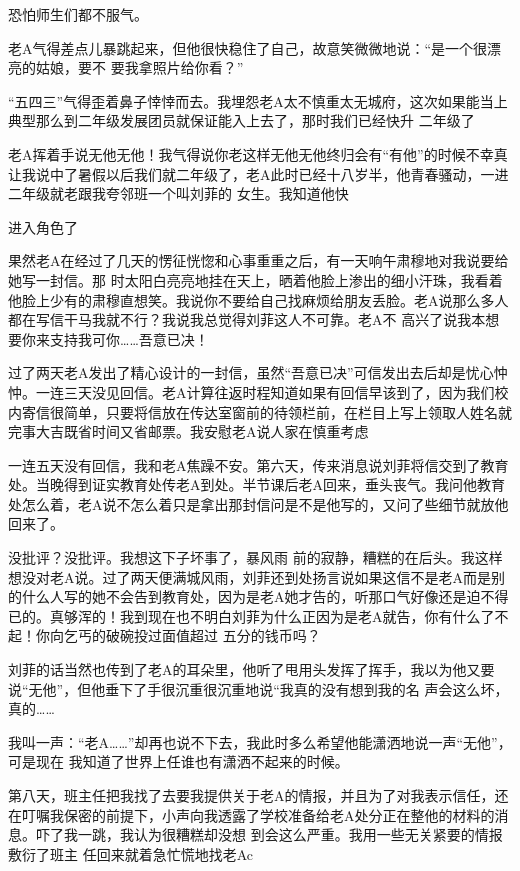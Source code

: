 \documentclass{article}
\begin{document}
恐怕师生们都不服气。 

老A气得差点儿暴跳起来，但他很快稳住了自己，故意笑微微地说：“是一个很漂亮的姑娘，要不
要我拿照片给你看？” 

“五四三”气得歪着鼻子悻悻而去。我埋怨老A太不慎重太无城府，这次如果能当上典型那么到二年级发展团员就保证能入上去了，那时我们已经快升
二年级了 

老A挥着手说无他无他！我气得说你老这样无他无他终归会有“有他”的时候不幸真让我说中了暑假以后我们就二年级了，老A此时已经十八岁半，他青春骚动，一进二年级就老跟我夸邻班一个叫刘菲的
女生。我知道他快 


进入角色了 

果然老A在经过了几天的愣征恍惚和心事重重之后，有一天响午肃穆地对我说要给她写一封信。那
\newpage
时太阳白亮亮地挂在天上，晒着他脸上渗出的细小汗珠，我看着他脸上少有的肃穆直想笑。我说你不要给自己找麻烦给朋友丢脸。老A说那么多人都在写信干马我就不行？我说我总觉得刘菲这人不可靠。老A不
高兴了说我本想要你来支持我可你……吾意已决！ 

过了两天老A发出了精心设计的一封信，虽然“吾意已决”可信发出去后却是忧心忡忡。一连三天没见回信。老A计算往返时程知道如果有回信早该到了，因为我们校内寄信很简单，只要将信放在传达室窗前的待领栏前，在栏目上写上领取人姓名就完事大吉既省时间又省邮票。我安慰老A说人家在慎重考虑
 

一连五天没有回信，我和老A焦躁不安。第六天，传来消息说刘菲将信交到了教育处。当晚得到证实教育处传老A到处。半节课后老A回来，垂头丧气。我问他教育处怎么着，老A说不怎么着只是拿出那封信问是不是他写的，又问了些细节就放他回来了。

没批评？没批评。我想这下子坏事了，暴风雨
\newpage
前的寂静，糟糕的在后头。我这样想没对老A说。过了两天便满城风雨，刘菲还到处扬言说如果这信不是老A而是别的什么人写的她不会告到教育处，因为是老A她才告的，听那口气好像还是迫不得已的。真够浑的！我到现在也不明白刘菲为什么正因为是老A就告，你有什么了不起！你向乞丐的破碗投过面值超过
五分的钱币吗？ 

刘菲的话当然也传到了老A的耳朵里，他听了甩用头发挥了挥手，我以为他又要说“无他”，但他垂下了手很沉重很沉重地说“我真的没有想到我的名
声会这么坏，真的…… 

我叫一声：“老A……”却再也说不下去，我此时多么希望他能潇洒地说一声“无他”，可是现在
我知道了世界上任谁也有潇洒不起来的时候。 

第八天，班主任把我找了去要我提供关于老A的情报，并且为了对我表示信任，还在叮嘱我保密的前提下，小声向我透露了学校准备给老A处分正在整他的材料的消息。吓了我一跳，我认为很糟糕却没想
\newpage
到会这么严重。我用一些无关紧要的情报敷衍了班主
任回来就着急忙慌地找老Ac 
\end{document}
